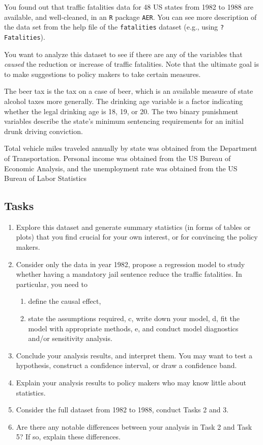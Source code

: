 \documentclass[12pt,]{book}
\providecommand{\tightlist}{%
  \setlength{\itemsep}{0pt}\setlength{\parskip}{0pt}}
\begin{document}
You found out that traffic fatalities data for 48 US states from 1982 to
1988 are available, and well-cleaned, in an \texttt{R} package
\texttt{AER}. You can see more description of the data set from the help
file of the \texttt{fatalities} dataset (e.g., using
\texttt{?Fatalities}).

You want to analyze this dataset to see if there are any of the
variables that \emph{caused} the reduction or increase of traffic
fatalities. Note that the ultimate goal is to make suggestions to policy
makers to take certain measures.

The beer tax is the tax on a case of beer, which is an available measure
of state alcohol taxes more generally. The drinking age variable is a
factor indicating whether the legal drinking age is 18, 19, or 20. The
two binary punishment variables describe the state's minimum sentencing
requirements for an initial drunk driving conviction.

Total vehicle miles traveled annually by state was obtained from the
Department of Transportation. Personal income was obtained from the US
Bureau of Economic Analysis, and the unemployment rate was obtained from
the US Bureau of Labor Statistics

\subsection{Tasks}\label{tasks-2}

\begin{enumerate}
\def\labelenumi{\arabic{enumi}.}
\tightlist
\item
  Explore this dataset and generate summary statistics (in forms of
  tables or plots) that you find crucial for your own interest, or for
  convincing the policy makers.
\item
  Consider only the data in year 1982, propose a regression model to
  study whether having a mandatory jail sentence reduce the traffic
  fatalities. In particular, you need to

  \begin{enumerate}
  \def\labelenumii{\alph{enumii}.}
  \tightlist
  \item
    define the causal effect,
  \item
    state the assumptions required, c, write down your model, d, fit the
    model with appropriate methods, e, and conduct model diagnostics
    and/or sensitivity analysis.
  \end{enumerate}
\item
  Conclude your analysis results, and interpret them. You may want to
  test a hypothesis, construct a confidence interval, or draw a
  confidence band.
\item
  Explain your analysis results to policy makers who may know little
  about statistics.
\item
  Consider the full dataset from 1982 to 1988, conduct Tasks 2 and 3.
\item
  Are there any notable differences between your analysis in Task 2 and
  Task 5? If so, explain these differences.
\end{enumerate}
\end{document}
